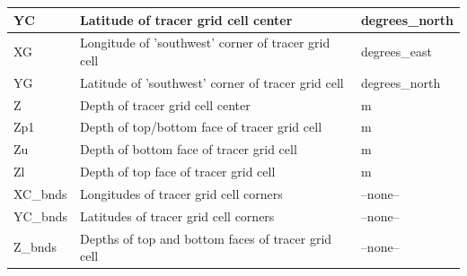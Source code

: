 \begin{longtable}{|m{}|m{}|m{}|}
YC &Latitude of tracer grid cell center &degrees\_north  \\ \hline
XG &Longitude of 'southwest' corner of tracer grid cell &degrees\_east  \\ \hline
YG &Latitude of 'southwest' corner of tracer grid cell &degrees\_north  \\ \hline
Z &Depth of tracer grid cell center &m  \\ \hline
Zp1 &Depth of top/bottom face of tracer grid cell &m  \\ \hline
Zu &Depth of bottom face of tracer grid cell &m  \\ \hline
Zl &Depth of top face of tracer grid cell &m  \\ \hline
XC\_bnds &Longitudes of tracer grid cell corners &--none--  \\ \hline
YC\_bnds &Latitudes of tracer grid cell corners &--none--  \\ \hline
Z\_bnds &Depths of top and bottom faces of tracer grid cell &--none--  \\ \hline
\end{longtable}

\newp
\pagebreak
